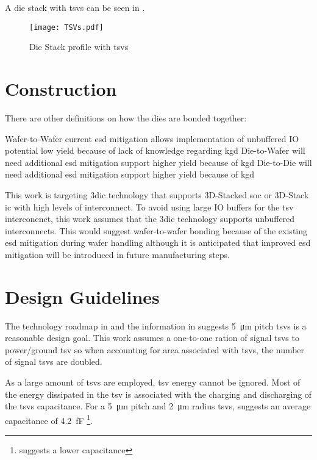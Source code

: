 A die stack with \acp{tsv} can be seen in .

\begin{figure}[h]
\centering
\captionsetup{justification=centering}
\captionsetup{width=.9\linewidth}
\centerline{
\mbox{\texttt{[image: TSVs.pdf]}}
}
\caption{Die Stack profile \cite{itrs2015_interconn} with \acp{tsv}}
\label{fig:tsv}
\end{figure}

\section{Construction}
\label{sec:3dic construction}

There are other definitions on how the dies are bonded together:
\begin{outline}
  \1 Wafer-to-Wafer
    \2 current \ac{esd} mitigation allows implementation of unbuffered IO
    \2 potential low yield because of lack of knowledge regarding \ac{kgd}
  \1 Die-to-Wafer
    \2 will need additional \ac{esd} mitigation support
    \2 higher yield because of \ac{kgd}
  \1 Die-to-Die
    \2 will need additional \ac{esd} mitigation support
    \2 higher yield because of \ac{kgd}
\end{outline}

This work is targeting \ac{3dic} technology that supports 3D-Stacked \ac{soc} or 3D-Stack \ac{ic} with high levels of interconnect.
To avoid using large IO buffers for the \ac{tsv} interconenct, this work assumes that the \ac{3dic} technology supports unbuffered interconnects. 
This would suggest wafer-to-wafer bonding because of the existing \ac{esd} mitigation during wafer handling although it is anticipated that improved \ac{esd} mitigation will be introduced in future manufacturing steps.

\section{Design Guidelines}
\label{sec:3dic Design Guidelines}

The technology roadmap in \cite{itrs2015_interconn} and the information in \cite{patti2014} suggests \SI{5}{\micro\meter} pitch \acp{tsv} is a reasonable design goal. 
This work assumes a one-to-one ration of signal \acp{tsv} to power/ground \ac{tsv} so when accounting for area associated with \acp{tsv}, the number of signal \acp{tsv} are doubled.

As a large amount of \acp{tsv} are employed, \ac{tsv} energy cannot be ignored.
Most of the energy dissipated in the \ac{tsv} is associated with the charging and discharging of the \acp{tsv} capacitance. For a \SI{5}{\micro\meter} pitch and \SI{2}{\micro\meter} radius \acp{tsv}, \cite{Bamberg2017} suggests an average capacitance of \SI{4.2}{\femto\farad} \footnote{\cite{tezzaron:preso} suggests a lower capacitance}.

